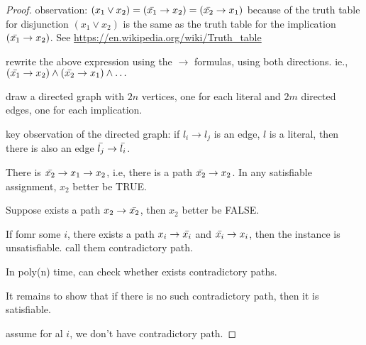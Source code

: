 \documentclass{article}
\theoremstyle{plain}
\theoremstyle{definition}
\begin{document}
\begin{proof}
observation: $(x_1 \lor x_2) = (\Bar{x_1} \rightarrow x_2) = (\Bar{x_2} \rightarrow x_1)$ because of the truth table for disjunction $(x_1 \lor x_2)$ is the same as the truth table for the implication $(\Bar{x_1} \rightarrow x_2)$. See  \url{https://en.wikipedia.org/wiki/Truth_table}

rewrite the above expression using the $\rightarrow$ formulas, using both directions. ie., $(\Bar{x_1} \rightarrow x_2) \land (\Bar{x_2} \rightarrow x_1) \land \dots$

draw a directed graph with $2n$ vertices, one for each literal and $2m$ directed edges, one for each implication. 

key observation of the directed graph: if $l_i \rightarrow l_j$ is an edge, $l$ is a literal, then there is also an edge $\Bar{l_j} \rightarrow \Bar{l_i}$. 

There is $\Bar{x_2} \rightarrow x_1 \rightarrow x_2$, i.e, there is a path $\Bar{x_2} \rightarrow x_2$. In any satisfiable assignment, $x_2$ better be TRUE. 

Suppose exists a path $x_2 \rightarrow \Bar{x_2}$, then $x_2$ better be FALSE. 

If fomr some $i$, there exists a path $x_i \rightarrow \Bar{x_i}$ and $\Bar{x_i} \rightarrow x_i$, then the instance is unsatisfiable. call them contradictory path. 

In poly(n) time, can check whether exists contradictory paths. 

It remains to show that if there is no such contradictory path,  then it is satisfiable. 

assume for al $i$, we don't have contradictory path. 
\end{proof}

\newpage 


\end{document}

